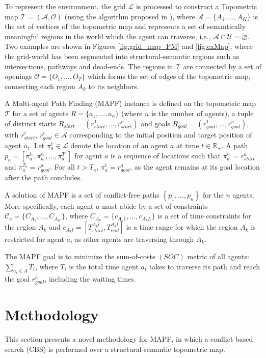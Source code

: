 \documentclass[letterpaper, 10 pt, conference]{ieeeconf}  %
\begin{document}
To represent the environment, the grid $\mathcal{L}$ is processed to construct a Topometric map $\mathcal{T}=(\mathcal{A},\mathcal{O})$ (using the algorithm proposed in \cite{FREDRIKSSON_SEMANTIC_MAPPING}), where $\mathcal{A}=\{A_1, \dots, A_K\}$ is the set of vertices of the topometric map and represents a set of semantically meaningful regions in the world which the agent can traverse, i.e., $\mathcal{A}\cap\mathcal{U}=\varnothing$. Two examples are shown in Figures \ref{fig:grid_map_PM} and \ref{fig:exMap}, where the grid-world has been segmented into structural-semantic regions such as intersections, pathways and dead-ends. The regions in $\mathcal{T}$ are connected by a set of openings $\mathcal{O}=\{O_1, \dots, O_T\}$ which forms the set of edges of the topometric map, connecting each region $A_k$ to its neighbors.

A Multi-agent Path Finding (MAPF) instance is defined on the topometric map $\mathcal{T}$ for a set of agents $R=\{a_1, \ldots, a_n\}$ (where $n$ is the number of agents), a tuple of distinct starts $R_{start}=(r_{start}^1, \ldots, r_{start}^{n})$ and goals $R_{goal}=(r_{goal}^1, \ldots, r_{goal}^{n})$, with $r_{start}^{i}$, $r_{goal}^{i} \in \mathcal{A}$ corresponding to the initial position and target position of agent $a_i$. Let $\pi_a^t \in \mathcal{L}$ denote the location of an agent $a$ at time $t \in \mathbb{R}_{+}$. A path $p_a= \left[\pi_a^{t_0}, \pi_a^{t_1}, \ldots, \pi_a^{T^a}\right]$ for agent $a$ is a sequence of locations such that $\pi_a^{t_0} = r_{start}^a$ and $\pi_a^{T_a} = r_{goal}^a$. For all $t>T_a$, $\pi_a^t=r_{goal}^a$, as the agent remains at its goal location after the path concludes. 

A solution of MAPF is a set of conflict-free paths $\left\{p_{1}, \ldots, p_{n}\right\}$ for the $n$ agents. 
More specifically, each agent $a$ must abide by a set of constraints $\mathcal{C}_a=\{C_{A_1},\dots, C_{A_K}\}$, where $C_{A_k}=\{c_{A_{k}1},\dots, c_{A_{k}L}\}$ is a set of time constraints for the region $A_k$ and $c_{A_{k}l}=[T_{start}^{A_{k}l}, T_{end}^{A_{k}l}]$ is a time range for which the region $A_k$ is restricted for agent $a$, as other agents are traversing through $A_k$.

The MAPF goal is to minimize the sum-of-costs $(S O C)$ metric of all agents: $\sum_{a_i \in A} T_i$, where $T_i$ is the total time agent $a_i$ takes to traverse its path and reach the goal $r_{goal}^a$, including the waiting times. 
\section{Methodology}
This section presents a novel methodology for MAPF, in which a conflict-based search (CBS) is performed over a structural-semantic topometric map. 
\end{document}
